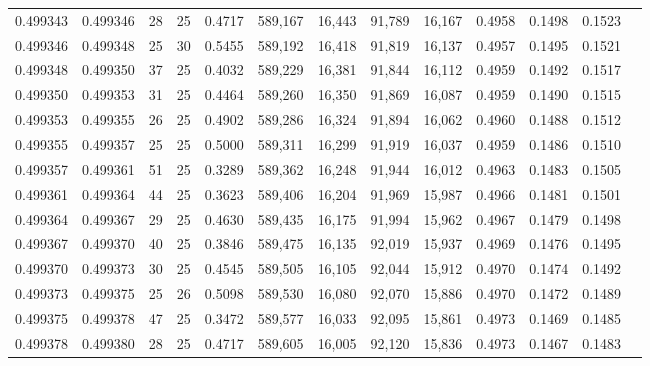 \begin{tabular}{rrrrrrrrrrrrr}
0.499343 & 0.499346 &    28 &  25 &                                     0.4717 & 589,167 &  16,443 &  91,789 &  16,167 & 0.4958 & 0.1498 & 0.1523 \\
0.499346 & 0.499348 &    25 &  30 &                                     0.5455 & 589,192 &  16,418 &  91,819 &  16,137 & 0.4957 & 0.1495 & 0.1521 \\
0.499348 & 0.499350 &    37 &  25 &                                     0.4032 & 589,229 &  16,381 &  91,844 &  16,112 & 0.4959 & 0.1492 & 0.1517 \\
0.499350 & 0.499353 &    31 &  25 &                                     0.4464 & 589,260 &  16,350 &  91,869 &  16,087 & 0.4959 & 0.1490 & 0.1515 \\
0.499353 & 0.499355 &    26 &  25 &                                     0.4902 & 589,286 &  16,324 &  91,894 &  16,062 & 0.4960 & 0.1488 & 0.1512 \\
0.499355 & 0.499357 &    25 &  25 &                                     0.5000 & 589,311 &  16,299 &  91,919 &  16,037 & 0.4959 & 0.1486 & 0.1510 \\
0.499357 & 0.499361 &    51 &  25 &                                     0.3289 & 589,362 &  16,248 &  91,944 &  16,012 & 0.4963 & 0.1483 & 0.1505 \\
0.499361 & 0.499364 &    44 &  25 &                                     0.3623 & 589,406 &  16,204 &  91,969 &  15,987 & 0.4966 & 0.1481 & 0.1501 \\
0.499364 & 0.499367 &    29 &  25 &                                     0.4630 & 589,435 &  16,175 &  91,994 &  15,962 & 0.4967 & 0.1479 & 0.1498 \\
0.499367 & 0.499370 &    40 &  25 &                                     0.3846 & 589,475 &  16,135 &  92,019 &  15,937 & 0.4969 & 0.1476 & 0.1495 \\
0.499370 & 0.499373 &    30 &  25 &                                     0.4545 & 589,505 &  16,105 &  92,044 &  15,912 & 0.4970 & 0.1474 & 0.1492 \\
0.499373 & 0.499375 &    25 &  26 &                                     0.5098 & 589,530 &  16,080 &  92,070 &  15,886 & 0.4970 & 0.1472 & 0.1489 \\
0.499375 & 0.499378 &    47 &  25 &                                     0.3472 & 589,577 &  16,033 &  92,095 &  15,861 & 0.4973 & 0.1469 & 0.1485 \\
0.499378 & 0.499380 &    28 &  25 &                                     0.4717 & 589,605 &  16,005 &  92,120 &  15,836 & 0.4973 & 0.1467 & 0.1483 \\

\end{tabular}
